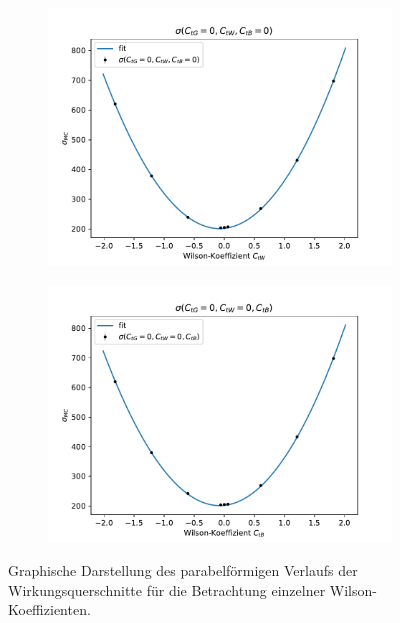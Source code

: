 \begin{figure}
  \begin{subfigure}[c]{0.5\textwidth}
    \centering
    \includegraphics[width=\textwidth]{Plots/combi_plot_tW.pdf}
    \label{fig:WtW}
  \end{subfigure}
  \begin{subfigure}[c]{0.5\textwidth}
    \centering
    \includegraphics[width=\textwidth]{Plots/combi_plot_tB.pdf}
    \label{fig:WtB}
  \end{subfigure}
  \caption{Graphische Darstellung des parabelförmigen Verlaufs der Wirkungsquerschnitte für die Betrachtung einzelner Wilson-Koeffizienten.}
\end{figure}
